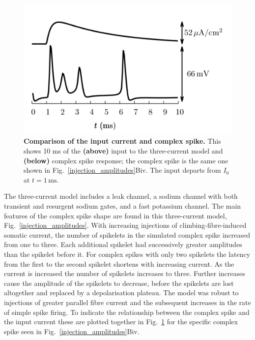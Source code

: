 \documentclass[twocolumn]{svjour3}          %
\newcommand{\mse}{\,\mathrm{ms}}
\begin{document}
\begin{figure}[!ht]
\includegraphics[width=\linewidth]{Figure2.png}
\caption{\textbf{Comparison of the input current and complex spike.}
  This shows 10 ms of the \textbf{(above)} input to the three-current
  model and \textbf{(below)} complex spike response; the complex spike
  is the same one shown in Fig.~\ref{injection_amplitudes}Biv. The input departs from $I_0$ at $t=1\mse$.}
    \label{fig:S1_fig}
\end{figure}

The three-current model includes a leak channel, a sodium channel with
both transient and resurgent sodium gates, and a fast potassium
channel. The main features of the complex spike shape are found in
this three-current model, Fig.~\ref{injection_amplitudes}. With
increasing injections of climbing-fibre-induced somatic current, the
number of spikelets in the simulated complex spike increased from one
to three. Each additional spikelet had successively greater amplitudes
than the spikelet before it. For complex spikes with only two
spikelets the latency from the first to the second spikelet shortens
with increasing current. As the current is increased the number of
spikelets increases to three. Further increases cause the amplitude of
the spikelets to decrease, before the spikelets are lost altogether
and replaced by a depolarisation plateau. The model was robust to
injections of greater parallel fibre current and the subsequent
increases in the rate of simple spike firing. To indicate the
relationship between the complex spike and the input current these are
plotted together in Fig.~\ref{fig:S1_fig} for the specific complex
spike seen in Fig.~\ref{injection_amplitudes}Biv.
\end{document}
